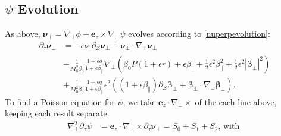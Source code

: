 \documentclass{article}
\newcommand{\para}{\parallel}
\newcommand{\ep}{\epsilon}
\newcommand{\np}{\nabla_\perp}
\newcommand{\p}{\partial}
\newcommand{\fr}{\frac{1+\ep q}{1+\ep\beta_\para}}
\newcommand{\pth} [1] {\left( #1 \right) }
\begin{document}
\subsection{$\psi$ Evolution}
As above, $\bm{\nu}_\perp = \np \phi + \bm{e}_z\times \np\psi$ evolves according to \eqref{nuperpevolution}: 
\begin{align*} 
    \p_\tau\bm{\nu}_\perp &= -\ep\nu_\para \p_Z\bm{\nu}_\perp - \bm{\nu}_\perp \cdot\np \bm{\nu}_\perp \\ 
    &-\frac{1}{M_0^2\beta_0} \fr \np \pth{\beta_0 P(1+\ep r) + \ep \beta_\para + \frac{1}{2}\ep^2 \beta_\para^2 + \frac{1}{2}\ep^2 |\bm{\beta}_\perp|^2} \\ 
    &+ \frac{1}{M_0^2\beta_0} \fr \ep^2 \pth{\pth{1+\ep\beta_\para} \p_Z \bm{\beta}_\perp + \bm{\beta}_\perp \cdot\np \bm{\beta}_\perp}. 
\end{align*}
To find a Poisson equation for $\psi$, we take $\bm{e}_z\cdot\np\times$ of the each line above, keeping each result separate: 
\begin{align} \label{psievolution}
    \np^2\p_\tau \psi &= \bm{e}_z\cdot \np \times \p_\tau \bm{\nu}_\perp = S_0 + S_1 + S_2 \text{, with }
\end{align}
\end{document}
